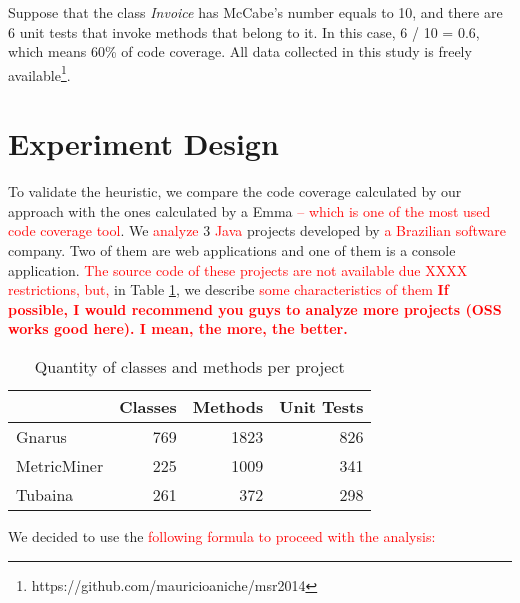 \documentclass{sig-alternate}
\begin{document}
Suppose that the class \textit{Invoice} has McCabe's number equals to 10, 
and there are 6 unit tests that invoke methods that belong to it. 
In this case, 6 / 10 = 0.6, which means 60\% of code coverage.
All data collected in this study is freely available\footnote{https://github.com/mauricioaniche/msr2014}.

\section{Experiment Design}
\label{sec-experiment}

To validate the heuristic, we  compare the code coverage calculated by  our approach with the ones 
calculated by a Emma \textcolor{red}{-- which is one of the most used code coverage tool}.  We
 \textcolor{red}{analyze} 3 \textcolor{red}{Java} projects  developed by \textcolor{red}{a Brazilian software}  company. Two of them are
web applications and one of them is a console application. \textcolor{red}{The source code of these projects are not available due XXXX restrictions, but,} in Table \ref{tab:projects}, we describe \textcolor{red}{some characteristics of them}
 \textcolor{red}{\textbf{If possible, I would recommend you guys to analyze more projects (OSS works good here). I mean, the more, the better.}}


\begin{table}[h!]
\centering
\caption{Quantity of classes and methods per project}
\begin{tabular}{ | l | r | r | r | }
\hline
& Classes & Methods & Unit Tests\\ 
\hline
Gnarus & 769 & 1823 & 826\\ 
MetricMiner & 225 & 1009 & 341\\ 
Tubaina & 261 & 372 & 298\\ 

\hline
\end{tabular}
\label{tab:projects}
\end{table}


 We decided to use the \textcolor{red}{following formula to proceed with the analysis:}
\end{document}
